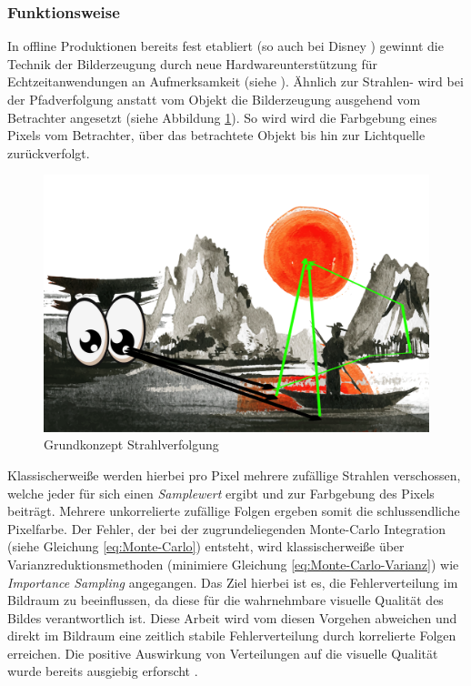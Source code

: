 \subsubsection{Funktionsweise}

In offline Produktionen bereits fest etabliert (so auch bei Disney \cite{DisneyPathTracing}) gewinnt die Technik
der Bilderzeugung durch neue Hardwareunterstützung für Echtzeitanwendungen an Aufmerksamkeit
(siehe \cite{Sch19}).
Ähnlich zur Strahlen- wird bei der Pfadverfolgung anstatt vom Objekt die Bilderzeugung ausgehend 
vom Betrachter angesetzt (siehe Abbildung \ref{pic::GrundkonzeptPathTracing}). So wird wird die 
Farbgebung eines Pixels vom Betrachter, über das betrachtete Objekt bis hin zur Lichtquelle zurückverfolgt.

\begin{figure}[H]
    \centering
    \includegraphics[width=\linewidth]{content/PathTracer/Bilder/PathTracerGuide.png}
    \caption{Grundkonzept Strahlverfolgung}
    \label{pic::GrundkonzeptPathTracing}
\end{figure}

Klassischerweiße werden hierbei pro Pixel mehrere zufällige Strahlen verschossen, welche jeder 
für sich einen \textit{Samplewert} ergibt und zur Farbgebung des Pixels beiträgt. Mehrere
unkorrelierte zufällige Folgen ergeben somit die schlussendliche Pixelfarbe. Der Fehler, der 
bei der zugrundeliegenden Monte-Carlo Integration (siehe Gleichung \ref{eq:Monte-Carlo}) entsteht, 
wird klassischerweiße 
über Varianzreduktionsmethoden (minimiere Gleichung \ref{eq:Monte-Carlo-Varianz}) wie \textit{Importance Sampling}
angegangen.
Das Ziel hierbei ist es, die Fehlerverteilung im Bildraum zu beeinflussen, da diese für die wahrnehmbare 
visuelle Qualität des Bildes verantwortlich ist. Diese Arbeit wird vom diesen Vorgehen abweichen und direkt im 
Bildraum eine zeitlich stabile 
Fehlerverteilung durch korrelierte Folgen erreichen. Die positive Auswirkung von  
Verteilungen auf die visuelle Qualität wurde bereits ausgiebig erforscht \cite{3288}.

